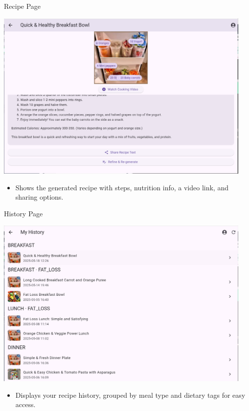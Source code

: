 \documentclass{beamer}
\begin{document}
\begin{frame}{Recipe Page}
    \begin{center}
        \includegraphics[width=0.95\textwidth,height=0.58\textheight,keepaspectratio]{recipe_page.png}
    \end{center}
    \vspace{2mm}
    \begin{itemize}
        \item \small Shows the generated recipe with steps, nutrition info, a video link, and sharing options.
    \end{itemize}
\end{frame}

\begin{frame}{History Page}
    \begin{center}
        \includegraphics[width=0.95\textwidth,height=0.58\textheight,keepaspectratio]{history_page.png}
    \end{center}
    \vspace{2mm}
    \begin{itemize}
        \item \small Displays your recipe history, grouped by meal type and dietary tags for easy access.
    \end{itemize}
\end{frame}
\end{document}
